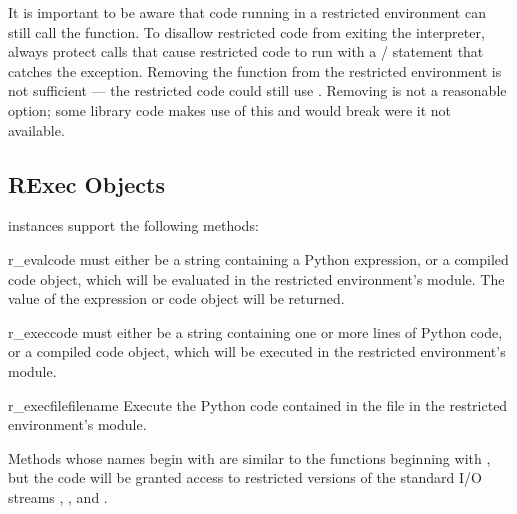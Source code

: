 It is important to be aware that code running in a restricted
environment can still call the  function.  To
disallow restricted code from exiting the interpreter, always protect
calls that cause restricted code to run with a
/ statement that catches the
 exception.  Removing the 
function from the restricted environment is not sufficient --- the
restricted code could still use .  Removing
 is not a reasonable option; some library code
makes use of this and would break were it not available.


\begin{seealso}
\end{seealso}


\subsection{RExec Objects \label{rexec-objects}}

 instances support the following methods:

\begin{methoddesc}{r_eval}{code}
 must either be a string containing a Python expression, or
a compiled code object, which will be evaluated in the restricted
environment's  module.  The value of the expression or
code object will be returned.
\end{methoddesc}

\begin{methoddesc}{r_exec}{code}
 must either be a string containing one or more lines of
Python code, or a compiled code object, which will be executed in the
restricted environment's  module.
\end{methoddesc}

\begin{methoddesc}{r_execfile}{filename}
Execute the Python code contained in the file  in the
restricted environment's  module.
\end{methoddesc}

Methods whose names begin with  are similar to the functions
beginning with , but the code will be granted access to
restricted versions of the standard I/O streams ,
, and .

